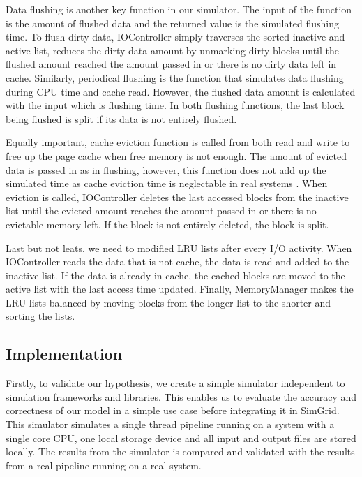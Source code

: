 \documentclass[conference]{IEEEtran}
\begin{document}
			Data flushing is another key function in our simulator. The input of the function is the amount of flushed data and the returned value is the simulated flushing time. To flush dirty data, IOController simply traverses the sorted inactive and active list, reduces the dirty data amount by unmarking dirty blocks until the flushed amount reached the amount passed in or there is no dirty data left in cache. Similarly, periodical flushing is the function that simulates data flushing during CPU time and cache read. However, the flushed data amount is calculated with the input which is flushing time. In both flushing functions, the last block being flushed is split if its data is not entirely flushed.			
				
			Equally important, cache eviction function is called from both read and write to free up the page cache when free memory is not enough. The amount of evicted data is passed in as in flushing, however, this function does not add up the simulated time as cache eviction time is neglectable in real systems . When eviction is called, IOController deletes the last accessed blocks from the inactive list until the evicted amount reaches the amount passed in or there is no evictable memory left. If the block is not entirely deleted, the block is split.
			
			Last but not leats, we need to modified LRU lists after every I/O activity. When IOController reads the data that is not cache, the data is read and added to the inactive list. If the data is already in cache, the cached blocks are moved to the active list with the last access time updated. Finally, MemoryManager makes the LRU lists balanced by moving blocks from the longer list to the shorter and sorting the lists.
			
		\subsection{Implementation}

			Firstly, to validate our hypothesis, we create a simple simulator independent to simulation frameworks and libraries. This enables us to evaluate the accuracy and correctness of our model in a simple use case before integrating it in SimGrid.  This simulator simulates a single thread pipeline running on a system with a single core CPU, one local storage device and all input and output files are stored locally. The results from the simulator is compared and validated with the results from a real pipeline running on a real system.
			
\end{document}
